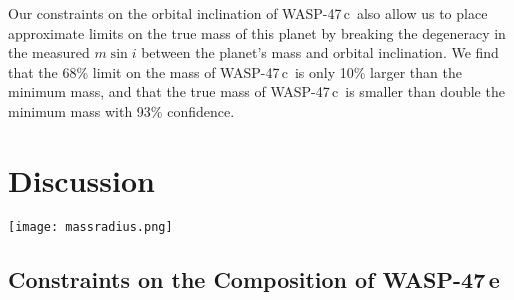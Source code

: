 \documentclass{emulateapj}
\newcommand{\ron}{\color{black}}
\newcommand{\thisstar}{WASP-47}
\newcommand{\thissecondplanet}{WASP-47\,e}
\newcommand{\thisfourthplanet}{WASP-47\,c}
\begin{document}
Our constraints on the orbital inclination of \thisfourthplanet\ also allow us to place approximate limits on the true mass of this planet {\ron by breaking the degeneracy in the measured $m\sin{i}$ between the planet's mass and orbital inclination}. We find that the 68\% limit on the mass of \thisfourthplanet\ is only 10\% larger than the minimum mass, and that the true mass of \thisfourthplanet\ is smaller than double the minimum mass with 93\% confidence. 

%
%
%
%
%
%




\section{Discussion}
\label{discussion}

\begin{figure*}[ht!] %
   \centering
   \texttt{[image: massradius.png]} 
   \caption{The mass/radius diagram for small exoplanets. Planet masses and radii are taken from the NASA Exoplanet Archive \citep{akeson}, accessed 2017 Feb 22. The symbol darkness is proportional to the precision with which the masses and radii are determined. Overplotted are theoretical mass/radius relations for solid planets of different compositions from \citet{zeng} and for cold hydrogen planets from \citet{seager}. Solar system planets are shown in blue, and the \thisstar\ planets are shown in purple. We also label 55 Cnc e to show the similarity in composition between it and \thissecondplanet--- both of these planets are less dense than an Earth-like composition, and likely have some volatiles around an Earth-like core.}
   \label{massradius}
\end{figure*}

\subsection{Constraints on the Composition of \thissecondplanet}
\end{document}
